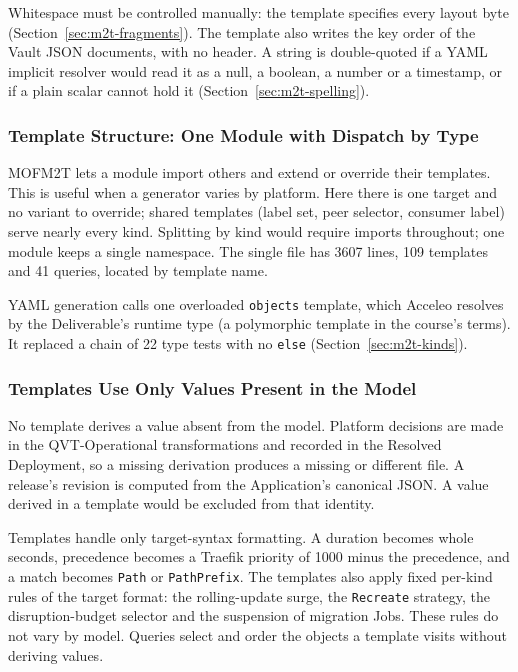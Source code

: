 Whitespace must be controlled manually: the template specifies every layout byte
(Section~\ref{sec:m2t-fragments}). The template also writes the key order of the
Vault JSON documents, with no header. A string is double-quoted if a YAML implicit resolver would read it as
a null, a boolean, a number or a timestamp, or if a plain scalar cannot hold it
(Section~\ref{sec:m2t-spelling}).

\subsubsection{Template Structure: One Module with Dispatch by Type}
\label{sec:m2t-structure}

MOFM2T lets a module import others and extend or override their templates. This is
useful when a generator varies by platform. Here there is one target and no
variant to override; shared templates (label set, peer selector, consumer
label) serve nearly every kind. Splitting by kind would require imports throughout;
one module keeps a single namespace. The single file has 3607 lines,
109 templates and 41 queries, located by template name.

YAML generation calls one overloaded \texttt{objects} template, which Acceleo resolves by the Deliverable's
runtime type (a polymorphic template in the course's terms). It replaced a chain
of 22 type tests with no \texttt{else} (Section~\ref{sec:m2t-kinds}).

\subsubsection{Templates Use Only Values Present in the Model}
\label{sec:m2t-decides}

No template derives a value absent from the model. Platform decisions are made in the
QVT-Operational transformations and recorded in the Resolved Deployment, so a
missing derivation produces a missing or different file. A release's revision is
computed from the Application's canonical JSON. A value derived in a template
would be excluded from that identity.

Templates handle only target-syntax formatting. A duration becomes whole seconds,
precedence becomes a Traefik priority of 1000 minus the precedence, and a match
becomes \texttt{Path} or \texttt{PathPrefix}. The templates also apply fixed
per-kind rules of the target format: the rolling-update surge, the
\texttt{Recreate} strategy, the disruption-budget selector and the suspension of
migration Jobs. These rules do not vary by model. Queries select and order the objects
a template visits without deriving values.

